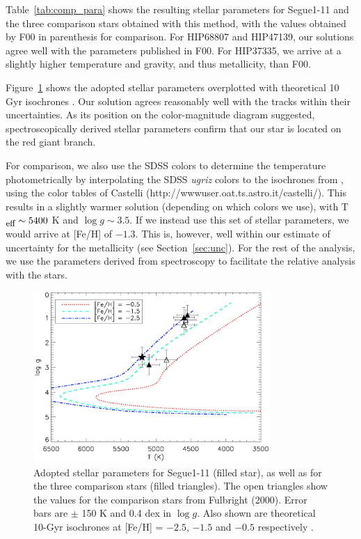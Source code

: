 \documentclass{emulateapj}
\begin{document}
Table~\ref{tab:comp_para} shows the resulting stellar parameters for Segue1-11 and the three comparison stars obtained with this method, with the values obtained by F00 in parenthesis for comparison. For HIP68807 and HIP47139, our solutions agree well with the parameters published in F00. For HIP37335, we arrive at a slightly higher temperature and gravity, and thus metallicity, than F00.


Figure~\ref{fig:isochr} shows the adopted stellar parameters overplotted with theoretical 10 Gyr isochrones \citep{Kim2002}. Our solution agrees reasonably well with the tracks within their uncertainties. As its position on the color-magnitude diagram suggested, spectroscopically derived stellar parameters confirm that our star is located on the red giant branch.

For comparison, we also use the SDSS colors to determine the temperature photometrically by interpolating the SDSS {\it ugriz} colors to the isochrones from \citet{Kim2002}, using the color tables of Castelli (http://wwwuser.oat.ts.astro.it/castelli/).  This results in a slightly warmer solution (depending on which colors we use), with T$_{\mbox{\small{eff}}} \sim 5400$ K and $\log g \sim 3.5$. If we instead use this set of stellar parameters, we would arrive at [Fe/H] of $-1.3$. This is, however, well within our estimate of uncertainty for the metallicity (see Section~\ref{sec:unc}). For the rest of the analysis, we use the parameters derived from spectroscopy to facilitate the relative analysis with the \citet{Fulbright2000} stars.




\begin{figure}
 \begin{center}
  \includegraphics[width=9cm]{isochrones_10Gyr.ps}
  \caption{Adopted stellar parameters for Segue1-11 (filled star), as well as for the three comparison stars (filled triangles). The open triangles show the values for the comparison stars from Fulbright (2000). Error bars are $\pm$ 150 K and 0.4 dex in $\log g$. Also shown are theoretical 10-Gyr isochrones at [Fe/H] = $-2.5$, $-1.5$ and $-0.5$ respectively \citep{Kim2002}.}
  \label{fig:isochr}
 \end{center}
\end{figure}
\end{document}
